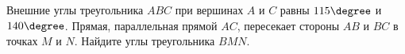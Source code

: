 \begin{ex}
	\begin{condition}
		Внешние углы треугольника \( ABC  \) при вершинах \( A  \) и \( C  \) равны \( 115\degree  \) и \( 140\degree \). Прямая, параллельная прямой \( AC \), пересекает стороны \( AB  \) и \( BC  \) в точках \( M  \) и \( N  \). Найдите углы треугольника \( BMN  \).
	\end{condition}
	\answer{\( 75\degree, 65\degree, 40\degree \)}
\end{ex}